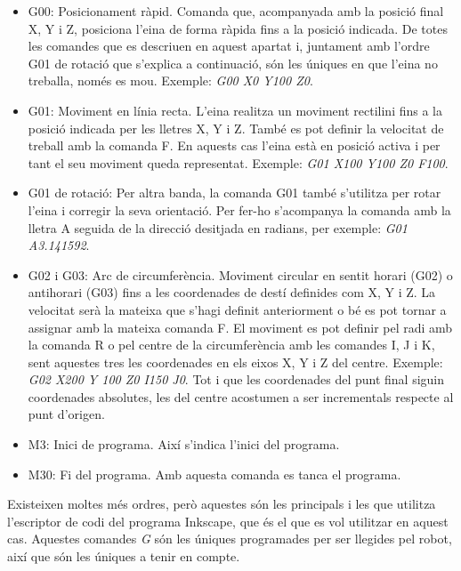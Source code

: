\begin{itemize}
	\item	G00: Posicionament ràpid. Comanda que, acompanyada amb la posició final X, Y i Z, posiciona l'eina de forma ràpida fins a la posició indicada. De totes les comandes que es descriuen en aquest apartat i, juntament amb l'ordre G01 de rotació que s'explica a continuació, són les úniques en que l'eina no treballa, només es mou. Exemple: \emph{G00 X0 Y100 Z0}.
	
	\item	G01: Moviment en línia recta. L'eina realitza un moviment rectilini fins a la posició indicada per les lletres X, Y i Z. També es pot definir la velocitat de treball amb la comanda F. En aquests cas l'eina està en posició activa i per tant el seu moviment queda representat. Exemple: \emph{G01 X100 Y100 Z0 F100}. 
	
	\item G01 de rotació: Per altra banda, la comanda G01 també s'utilitza per rotar l'eina i corregir la seva orientació. Per fer-ho s'acompanya la comanda  amb la lletra A seguida de la direcció desitjada en radians, per exemple: \emph{G01 A3.141592}.
	
	\item	G02 i G03: Arc de circumferència.  Moviment circular en sentit horari (G02) o antihorari (G03) fins a les coordenades de destí definides com X, Y i Z. La velocitat serà la mateixa que s'hagi definit anteriorment o bé es pot tornar a assignar amb la mateixa comanda F. El moviment es pot definir pel radi amb la comanda R o pel centre de la circumferència amb les comandes I, J i K, sent aquestes tres les coordenades en els eixos X, Y i Z del centre. Exemple: \emph{G02 X200 Y 100 Z0 I150 J0}. Tot i que les coordenades del punt final siguin coordenades absolutes, les del centre acostumen a ser incrementals respecte al punt d'origen.
	
	\item	M3: Inici de programa. Així s'indica l'inici del programa.
	
	\item	M30: Fi del programa. Amb aquesta comanda es tanca el programa. 
\end{itemize}
Existeixen moltes més ordres, però aquestes són les principals i les que utilitza l'escriptor de codi  del programa Inkscape, que és el que es vol utilitzar en aquest cas. Aquestes comandes \emph{G} són les úniques programades per ser llegides pel robot, així que són les úniques a tenir en compte. 



